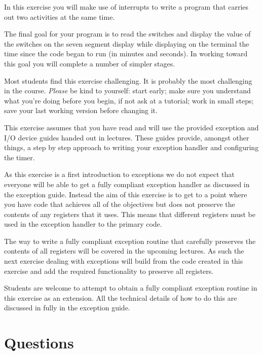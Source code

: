 \documentclass[a4paper,10pt]{article}
\begin{document}
In this exercise you will make use of interrupts to write a program
that carries out two activities at the same time.

The final goal for your program is to read the switches and display
the value of the switches on the seven segment display while
displaying on the terminal the time since the code began to run (in
minutes and seconds).  In working toward this goal you will complete
a number of simpler stages.

Most students find this exercise challenging.  It is probably the most
challenging in the course.  {\em Please} be kind to yourself: start
early; make sure you understand what you're doing before you begin, if
not ask at a tutorial; work in small steps; save your last working
version before changing it.

This exercise assumes that you have read and will use the provided
exception and I/O device guides handed out in lectures. These guides
provide, amongst other things, a step by step approach to writing your
exception handler and configuring the timer.

As this exercise is a first introduction to exceptions we do not
expect that everyone will be able to get a fully compliant exception
handler as discussed in the exception guide. Instead the aim of this
exercise is to get to a point where you have code that achieves all of
the objectives but does not preserve the contents of any registers
that it uses. This means that different registers must be used in the
exception handler to the primary code.

The way to write a fully compliant exception routine that carefully
preserves the contents of all registers will be covered in the
upcoming lectures. As such the next exercise dealing with exceptions
will build from the code created in this exercise and add the required
functionality to preserve all registers.

Students are welcome to attempt to obtain a fully compliant exception
routine in this exercise as an extension. All the technical details of
how to do this are discussed in fully in the exception guide.

\section{Questions}
\end{document}
